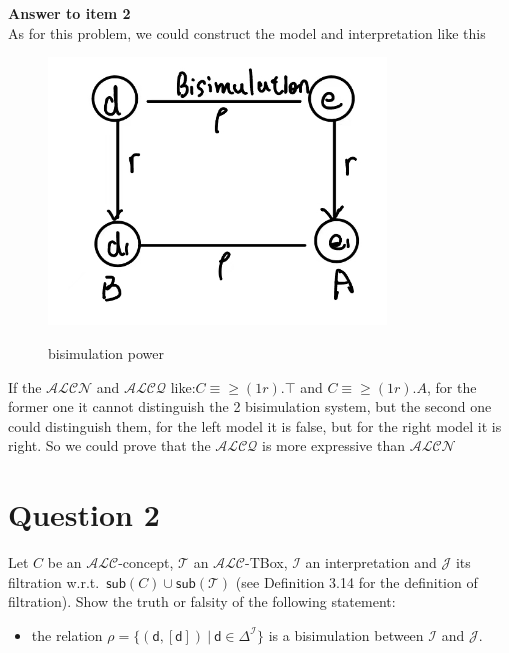 \documentclass{article}
\begin{document}
    \textbf{Answer to item 2}\\
    As for this problem, we could construct the model and interpretation like this\\
    \begin{figure}[H]
        \centering
        \includegraphics[width=0.8\textwidth]{1.png}\\
        \caption{bisimulation power}
        \label{fig:bisimulation}
    \end{figure}        
    If the $\mathcal{ALCN}$ and $\mathcal{ALCQ}$ like:$C\equiv \geq(1r).\top$ and $C\equiv \geq(1r).A$, for the former one it cannot distinguish the 2 bisimulation system, but the second one could distinguish them, for the left model it is false, but for the right model it is right. So we could prove that the  $\mathcal{ALCQ}$ is more expressive than $\mathcal{ALCN}$\\

    \section{Question 2}
    Let $C$ be an $\mathcal{ALC}$-concept, $\mathcal{T}$ an $\mathcal{ALC}$-TBox, $\mathcal{I}$ an interpretation and $\mathcal{J}$ its filtration w.r.t.\ $\textsf{sub}(C)\cup\textsf{sub}(\mathcal{T})$ (see Definition 3.14 for the definition of filtration). Show the truth or falsity of the following statement:
    \begin{itemize}
        \item the relation $\rho=\{(\textsf{d}, [\textsf{d}])~|~\textsf{d}\in\Delta^{\mathcal{I}}\}$ is a bisimulation between $\mathcal{I}$ and $\mathcal{J}$.
    \end{itemize}
\end{document}
